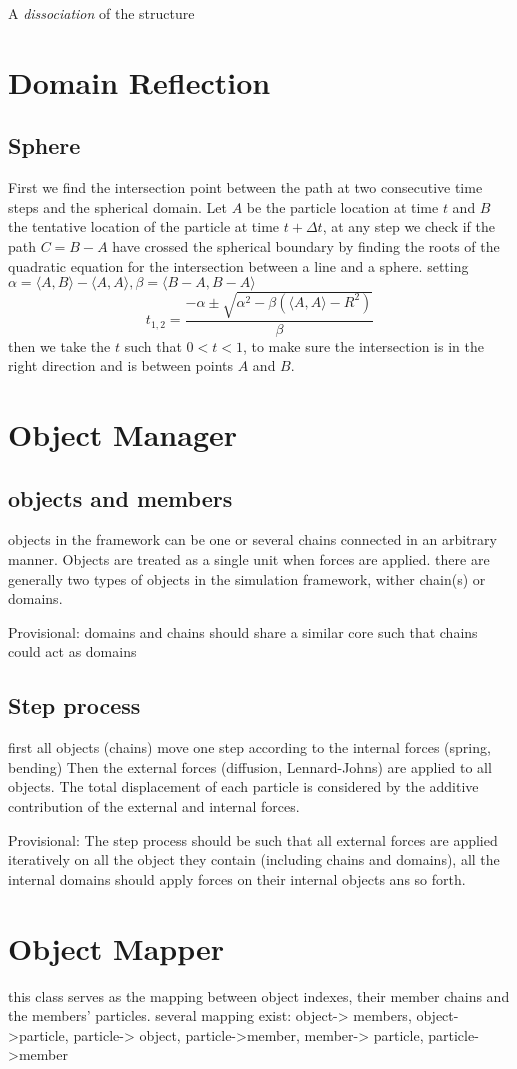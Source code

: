 \documentclass[12pt]{report}
\begin{document}
A \textit{dissociation} of the structure 
 

\section{Domain Reflection}
\subsection{Sphere}
First we find the intersection point between the path at two consecutive time steps and the spherical domain. Let $A$ be the particle location at time $t$ and $B$ the tentative location of the particle at time $t+\Delta t$, at any step we check if the path $C=B-A$ have crossed the spherical boundary by finding the roots of the quadratic equation for the intersection between a line and a sphere. setting $\alpha= \langle A,B \rangle -\langle A,A \rangle , \beta = \langle B-A,B-A \rangle$
\begin{equation*}
t_{1,2}=\frac{-\alpha \pm \sqrt{\alpha^2-\beta (\langle A,A \rangle -R^2)}}{\beta}
\end{equation*}
then we take the $t$ such that $0<t<1$, to make sure the intersection is in the right direction and is between points $A$ and $B$.

\section{Object Manager}
\subsection{objects and members}
objects in the framework can be one or several chains connected in an arbitrary manner. Objects are treated as a single unit when forces are applied. 
there are generally two types of objects in the simulation framework, wither  chain(s) or domains. 

Provisional: domains and chains should share a similar core such that chains could act as domains 

\subsection{Step process}
first all objects (chains) move one step according to the internal forces (spring, bending)
Then the external forces (diffusion, Lennard-Johns) are applied to all objects. 
The total displacement of each particle is considered by the additive contribution of the external and internal forces. 

Provisional: The step process should be such that all external forces are applied iteratively on all the object they contain (including chains and domains), all the internal domains should apply forces on their internal objects ans so forth. 

\section{Object Mapper}
this class serves as the mapping between object indexes, their member chains and the members' particles. 
several mapping exist: object-> members, object->particle, particle-> object,  particle->member, member-> particle, particle->member
\end{document}
